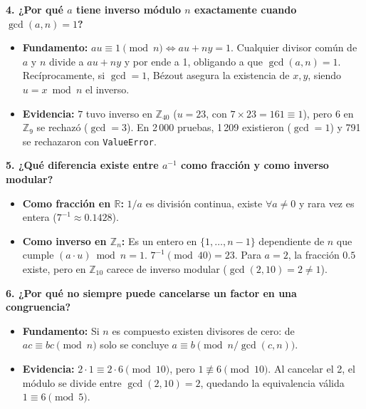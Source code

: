 \smallskip
\noindent\textbf{4. ¿Por qué \texorpdfstring{$a$}{a} tiene inverso módulo \texorpdfstring{$n$}{n} exactamente cuando \texorpdfstring{$\gcd(a, n) = 1$}{mcd(a, n) = 1}?}
\begin{itemize}\setlength\itemsep{0pt}\setlength\parskip{0pt}
    \item \textbf{Fundamento:} $au \equiv 1 \pmod n \iff au + ny = 1$. Cualquier divisor común de $a$ y $n$ divide a $au + ny$ y por ende a 1, obligando a que $\gcd(a, n) = 1$. Recíprocamente, si $\gcd = 1$, Bézout asegura la existencia de $x, y$, siendo $u = x \bmod n$ el inverso.
    \item \textbf{Evidencia:} $7$ tuvo inverso en $\mathbb{Z}_{40}$ ($u = 23$, con $7 \times 23 = 161 \equiv 1$), pero $6$ en $\mathbb{Z}_9$ se rechazó ($\gcd = 3$). En 2\,000 pruebas, 1\,209 existieron ($\gcd=1$) y 791 se rechazaron con \texttt{ValueError}.
\end{itemize}

\smallskip
\noindent\textbf{5. ¿Qué diferencia existe entre \texorpdfstring{$a^{-1}$}{a\textasciicircum -1} como fracción y como inverso modular?}
\begin{itemize}\setlength\itemsep{0pt}\setlength\parskip{0pt}
    \item \textbf{Como fracción en $\mathbb{R}$:} $1/a$ es división continua, existe $\forall a \neq 0$ y rara vez es entera ($7^{-1} \approx 0.1428$).
    \item \textbf{Como inverso en $\mathbb{Z}_n$:} Es un entero en $\{1, \dots, n-1\}$ dependiente de $n$ que cumple $(a \cdot u) \bmod n = 1$. $7^{-1} \pmod{40} = 23$. Para $a = 2$, la fracción $0.5$ existe, pero en $\mathbb{Z}_{10}$ carece de inverso modular ($\gcd(2, 10) = 2 \neq 1$).
\end{itemize}

\smallskip
\noindent\textbf{6. ¿Por qué no siempre puede cancelarse un factor en una congruencia?}
\begin{itemize}\setlength\itemsep{0pt}\setlength\parskip{0pt}
    \item \textbf{Fundamento:} Si $n$ es compuesto existen divisores de cero: de $ac \equiv bc \pmod n$ solo se concluye $a \equiv b \pmod{n / \gcd(c, n)}$.
    \item \textbf{Evidencia:} $2 \cdot 1 \equiv 2 \cdot 6 \pmod{10}$, pero $1 \not\equiv 6 \pmod{10}$. Al cancelar el 2, el módulo se divide entre $\gcd(2, 10) = 2$, quedando la equivalencia válida $1 \equiv 6 \pmod 5$.
\end{itemize}

